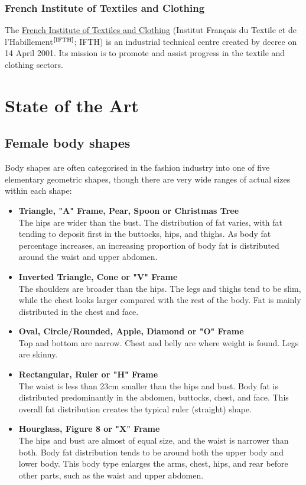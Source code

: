 \documentclass[12pt,a4paper,openany,UKenglish]{scrreprt}
\newcommand{\bib}[1]{$^\text{\cite{#1}}$}
\begin{document}
\subsection{French Institute of Textiles and Clothing}
The \href{https://www.la-federation.com/fr/nos-actions-de-lobby/partenaires/institut-francais-du-textile-habillement-ifth-1343.html}{French Institute of Textiles and Clothing} (Institut Français du Textile et de l'Habillement\bib{IFTH}; IFTH) is an industrial technical centre created by decree on 14 April 2001.
Its mission is to promote and assist progress in the textile and clothing sectors.
\newpage

\rmfamily
\chapter{State of the Art}
\section{Female body shapes}
Body shapes are often categorised in the fashion industry into one of five elementary geometric shapes, though there are very wide ranges of actual sizes within each shape:

\begin{itemize}
	\setlength\itemsep{-0.25em}
	\item \textbf{Triangle, "A" Frame, Pear, Spoon or Christmas Tree}\\
	      The hips are wider than the bust.
	      The distribution of fat varies, with fat tending to deposit first in the buttocks, hips, and thighs.
	      As body fat percentage increases, an increasing proportion of body fat is distributed around the waist and upper abdomen.
	\item \textbf{Inverted Triangle, Cone or "V" Frame}\\
	      The shoulders are broader than the hips.
	      The legs and thighs tend to be slim, while the chest looks larger compared with the rest of the body.
	      Fat is mainly distributed in the chest and face.
	\item \textbf{Oval, Circle/Rounded, Apple, Diamond or "O" Frame}\\
	      Top and bottom are narrow.
	      Chest and belly are where weight is found.
	      Legs are skinny.
	\item \textbf{Rectangular, Ruler or "H" Frame}\\
	      The waist is less than 23cm smaller than the hips and bust.
	      Body fat is distributed predominantly in the abdomen, buttocks, chest, and face.
	      This overall fat distribution creates the typical ruler (straight) shape.
	\item \textbf{Hourglass, Figure 8 or "X" Frame}\\
	      The hips and bust are almost of equal size, and the waist is narrower than both.
	      Body fat distribution tends to be around both the upper body and lower body.
	      This body type enlarges the arms, chest, hips, and rear before other parts, such as the waist and upper abdomen.
\end{itemize}
\end{document}
